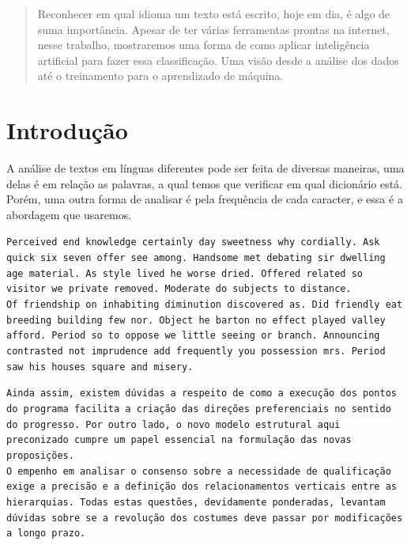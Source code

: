 \documentclass[a0,portrait]{a0poster}
\begin{document}
\begin{multicols}{2} %

\begin{abstract}
    Reconhecer em qual idioma um texto está escrito, hoje em dia, é algo de suma importância. Apesar de ter várias ferramentas prontas na internet, nesse trabalho, mostraremos uma forma de como aplicar inteligência artificial para fazer essa classificação. Uma visão desde a análise dos dados até o treinamento para o aprendizado de máquina.
\end{abstract}


\section*{Introdução}
A análise de textos em línguas diferentes pode ser feita de diversas maneiras, uma delas é em relação as palavras, a qual temos que verificar em qual dicionário está. Porém, uma outra forma de analisar é pela frequência de cada caracter, e essa é a abordagem que usaremos.

\begin{multicols}{2}
    \begin{framed}
        \texttt{Perceived end knowledge certainly day sweetness why cordially. Ask quick six seven offer see among. Handsome met debating sir dwelling age material. As style lived he worse dried. Offered related so visitor we private removed. Moderate do subjects to distance.\\Of friendship on inhabiting diminution discovered as. Did friendly eat breeding building few nor. Object he barton no effect played valley afford. Period so to oppose we little seeing or branch. Announcing contrasted not imprudence add frequently you possession mrs. Period saw his houses square and misery.}
    \end{framed}
    \begin{framed}
        \texttt{Ainda assim, existem dúvidas a respeito de como a execução dos pontos do programa facilita a criação das direções preferenciais no sentido do progresso. Por outro lado, o novo modelo estrutural aqui preconizado cumpre um papel essencial na formulação das novas proposições.\\O empenho em analisar o consenso sobre a necessidade de qualificação exige a precisão e a definição dos relacionamentos verticais entre as hierarquias. Todas estas questões, devidamente ponderadas, levantam dúvidas sobre se a revolução dos costumes deve passar por modificações a longo prazo.}
    \end{framed}
\end{multicols}\vspace{1cm}


\end{multicols}
\end{document}
